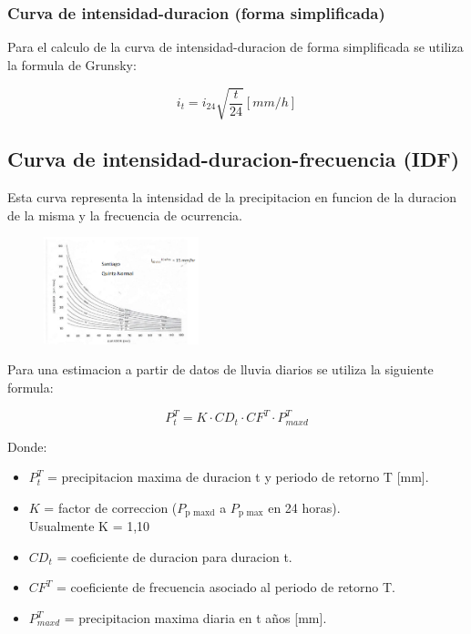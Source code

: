 \subsubsection{Curva de intensidad-duracion (forma simplificada)}

Para el calculo de la curva de intensidad-duracion de forma simplificada se utiliza la formula de Grunsky:

\begin{equation}
    i_t = i_{24} \sqrt{\frac{t}{24}} [mm/h]
\end{equation}

\subsection{Curva de intensidad-duracion-frecuencia (IDF)}

Esta curva representa la intensidad de la precipitacion en funcion de la duracion de la misma y la frecuencia de ocurrencia.\\

\begin{figure}[H]
    \centering
    \includegraphics[width=0.4\textwidth]{imagenes/curva_idf.png}
    \label{curva_idf}
\end{figure}

Para una estimacion a partir de datos de lluvia diarios se utiliza la siguiente formula:

\begin{equation}
    P_t^T = K \cdot CD_t \cdot CF^T \cdot P_{maxd}^T
\end{equation}

Donde:
\begin{itemize}
    \item $P_t^T$ = precipitacion maxima de duracion t y periodo de retorno T [mm].
    \item $K$ = factor de correccion ($P_{\text{p maxd}}$ a $P_{\text{p max}}$ en 24 horas).\\ Usualmente K = 1,10
    \item $CD_t$ = coeficiente de duracion para duracion t.
    \item $CF^T$ = coeficiente de frecuencia asociado al periodo de retorno T.
    \item $P_{maxd}^T$ = precipitacion maxima diaria en t años [mm].
\end{itemize}

